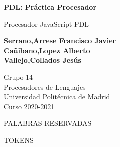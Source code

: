 \documentclass{article}
\begin{document}
\begin{titlepage}
    \begin{center}
        \vspace*{1cm}

        \Huge
        \textbf{PDL: Práctica Procesador}
        
        \vspace{0.5cm}
        \large
        Procesador JavaScript-PDL
        
        \vspace{3cm}
       
        \textbf{
            Serrano,Arrese Francisco Javier\\
            Cañibano,Lopez Alberto\\
            Vallejo,Collados Jesús
            }
            
        \vspace{8cm}
    
        \large
        Grupo 14 \\
        Procesadores de Lenguajes\\
        Universidad Politécnica de Madrid\\
        Curso 2020-2021
        
    \end{center}
\end{titlepage}
\newpage
\begin{center}
    PALABRAS RESERVADAS
\end{center}
\begin{center}
    TOKENS
\end{center}
\end{document}
